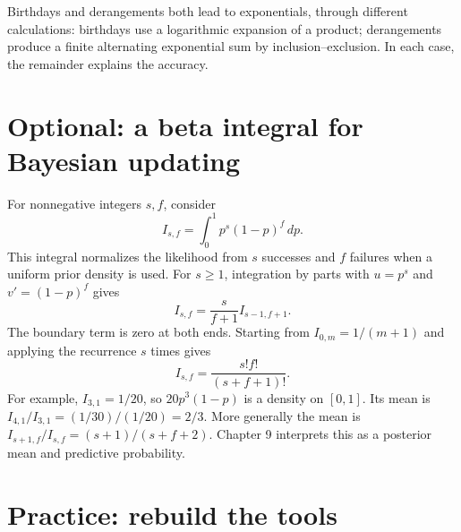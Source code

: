 Birthdays and derangements both lead to exponentials, through different
calculations: birthdays use a logarithmic expansion of a product;
derangements produce a finite alternating exponential sum by
inclusion--exclusion. In each case, the remainder explains the accuracy.

\section{Optional: a beta integral for Bayesian updating}
\label{sec:calc-beta}

For nonnegative integers $s,f$, consider
\[
 I_{s,f}=\int_0^1p^s(1-p)^f\,dp.
\]
This integral normalizes the likelihood from $s$ successes and $f$
failures when a uniform prior density is used. For $s\ge1$, integration
by parts with $u=p^s$ and $v'= (1-p)^f$ gives
\[
 I_{s,f}=\frac{s}{f+1}I_{s-1,f+1}.
\]
The boundary term is zero at both ends. Starting from
$I_{0,m}=1/(m+1)$ and applying the recurrence $s$ times gives
\[
 I_{s,f}=\frac{s!f!}{(s+f+1)!}.
\]
For example, $I_{3,1}=1/20$, so $20p^3(1-p)$ is a density on $[0,1]$.
Its mean is $I_{4,1}/I_{3,1}=(1/30)/(1/20)=2/3$.
More generally the mean is
$I_{s+1,f}/I_{s,f}=(s+1)/(s+f+2)$.
Chapter 9 interprets this as a posterior mean and predictive probability.

\clearpage
\section{Practice: rebuild the tools}
\label{sec:calc-exercises}

